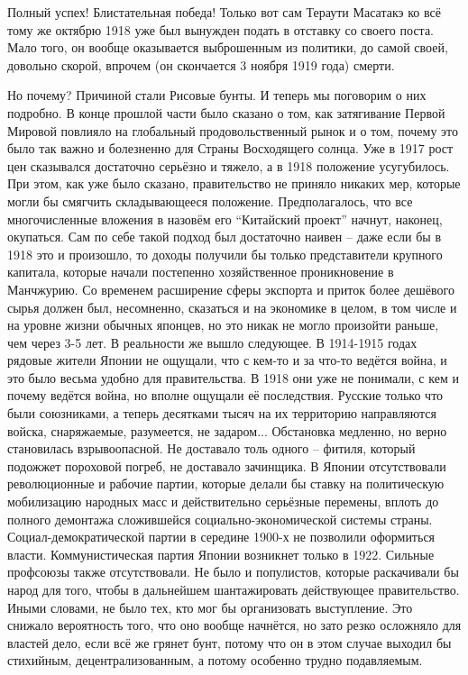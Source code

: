 Полный успех! Блистательная победа! Только вот сам Тераути Масатакэ ко всё тому же октябрю 1918 уже был вынужден подать в отставку со своего поста. Мало того, он вообще оказывается выброшенным из политики, до самой своей, довольно скорой, впрочем (он скончается 3 ноября 1919 года) смерти.

Но почему? Причиной стали Рисовые бунты. И теперь мы поговорим о них подробно. В конце прошлой части было сказано о том, как затягивание Первой Мировой повлияло на глобальный продовольственный рынок и о том, почему это было так важно и болезненно для Страны Восходящего солнца. Уже в 1917 рост цен сказывался достаточно серьёзно и тяжело, а в 1918 положение усугубилось. При этом, как уже было сказано, правительство не приняло никаких мер, которые могли бы смягчить складывающееся положение. Предполагалось, что все многочисленные вложения в назовём его “Китайский проект” начнут, наконец, окупаться. Сам по себе такой подход был достаточно наивен – даже если бы в 1918 это и произошло, то доходы получили бы только представители крупного капитала, которые начали постепенно хозяйственное проникновение в Манчжурию. Со временем расширение сферы экспорта и приток более дешёвого сырья должен был, несомненно, сказаться и на экономике в целом, в том числе и на уровне жизни обычных японцев, но это никак не могло произойти раньше, чем через 3-5 лет. В реальности же вышло следующее. В 1914-1915 годах рядовые жители Японии не ощущали, что с кем-то и за что-то ведётся война, и это было весьма удобно для правительства. В 1918 они уже не понимали, с кем и почему ведётся война, но вполне ощущали её последствия. Русские только что были союзниками, а теперь десятками тысяч на их территорию направляются войска, снаряжаемые, разумеется, не задаром... Обстановка медленно, но верно становилась взрывоопасной. Не доставало толь одного – фитиля, который подожжет пороховой погреб, не доставало зачинщика. В Японии отсутствовали революционные и рабочие партии, которые делали бы ставку на политическую мобилизацию народных масс и действительно серьёзные перемены, вплоть до полного демонтажа сложившейся социально-экономической системы страны. Социал-демократической партии в середине 1900-х не позволили оформиться власти. Коммунистическая партия Японии возникнет только в 1922. Сильные профсоюзы также отсутствовали. Не было и популистов, которые раскачивали бы народ для того, чтобы в дальнейшем шантажировать действующее правительство. Иными словами, не было тех, кто мог бы организовать выступление. Это снижало вероятность того, что оно вообще начнётся, но зато резко осложняло для властей дело, если всё же грянет бунт, потому что он в этом случае выходил бы стихийным, децентрализованным, а потому особенно трудно подавляемым.


